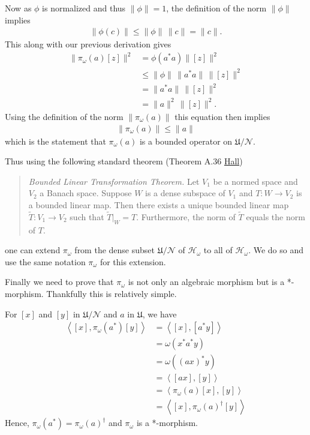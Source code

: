 Now as $\phi$ is normalized and thus $\|\phi\|=1$, the definition of the norm $\|\phi\|$ implies
\begin{align}
    \|\phi(c)\| \le \|\phi\| \, \|c\| = \|c\|.
\end{align}
This along with our previous derivation gives
\begin{align}
    \|\pi_\omega(a)[z]\|^2 &= \phi(a^*a) \|[z]\|^2 \\
                           &\le \|\phi\| \, \|a^*a\| \, \|[z]\|^2 \\
                           &=  \|a^*a\| \, \|[z]\|^2 \\
                           &= \|a\|^2 \, \|[z]\|^2.
\end{align}
Using the definition of the norm $\|\pi_\omega(a)\|$ this equation then implies
\begin{align}
    \|\pi_\omega(a)\| \le \|a\|
\end{align}
which is the statement that $\pi_\omega(a)$ is a bounded operator on $\mathfrak{U} / \mathcal{N}$.

Thus using the following standard theorem (Theorem A.36 \href{https://doi.org/10.1007/978-1-4614-7116-5}{Hall})

\begin{quote}
    \textit{Bounded Linear Transformation Theorem.} Let $V_1$ be a normed space and $V_2$ a Banach space. Suppose $W$ is a dense subspace of $V_1$ and $T: W \rightarrow V_2$ is a bounded linear map. Then there exists a unique bounded linear map $\widetilde{T}: V_1 \rightarrow V_2$ such that $\widetilde{T}|_W = T$. Furthermore, the norm of $\widetilde{T}$ equals the norm of $T$.
\end{quote}

\noindent one can extend $\pi_\omega$ from the dense subset $\mathfrak{U} / \mathcal{N}$ of $\mathcal{H}_\omega$ to all of $\mathcal{H}_\omega$. We do so and use the same notation $\pi_\omega$ for this extension.

Finally we need to prove that $\pi_\omega$ is not only an algebraic morphism but is a *-morphism. Thankfully this is relatively simple.

For $[x]$ and $[y]$ in $\mathfrak{U} / \mathcal{N}$ and $a$ in $\mathfrak{U}$, we have
\begin{align}
    \left<[x], \pi_\omega(a^*)[y]\right> &= \left<[x], [a^*y]\right> \\
                                         &= \omega(x^*a^*y) \\
                                         &= \omega((ax)^*y) \\
                                         &= \left<[ax], [y]\right> \\
                                         &= \left<\pi_\omega(a)[x], [y]\right> \\
                                         &= \left<[x], \pi_\omega(a)^\dagger [y]\right>
\end{align}
Hence, $\pi_\omega(a^*) = \pi_\omega(a)^\dagger$ and $\pi_\omega$ is a *-morphism.

